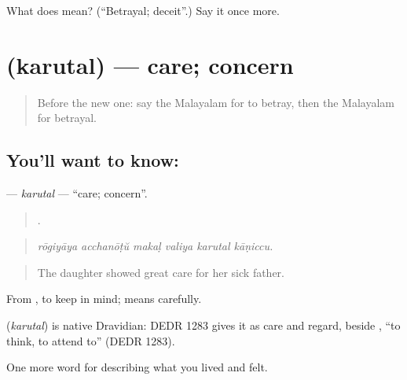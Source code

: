 \begin{tcolorbox}[breakable,colback=teal!4,colframe=teal!35!black,title={Before you move on}]
What does  mean? (\textquotedblleft{}Betrayal; deceit\textquotedblright{}.) Say it once more.
\end{tcolorbox}
\section[\texorpdfstring{\ml{കരുതൽ} (karutal)}{കരുതൽ (karutal)}]{ (karutal) — care; concern}

\label{lesson:ML-C556-karutal}



\begin{quote}
Before the new one: say the Malayalam for to betray, then the Malayalam for betrayal.
\end{quote}

\subsection*{You'll want to know: }
\textbf{} — \emph{karutal} — \textquotedblleft{}care; concern\textquotedblright{}.

\begin{quote}
     .
\end{quote}

\begin{quote}
\emph{rōgiyāya acchanōṭŭ makaḷ valiya karutal kāṇiccu.}
\end{quote}

\begin{quote}
The daughter showed great care for her sick father.
\end{quote}

From , to keep in mind;  means carefully.

\begin{cousinweb}
\textbf{} (\emph{karutal}) is native Dravidian: DEDR 1283 gives it as care and regard, beside , \textquotedblleft{}to think, to attend to\textquotedblright{} (DEDR 1283).
\end{cousinweb}

\begin{grammarlens}[title={What you've built}]
One more word for describing what you lived and felt.
\end{grammarlens}

